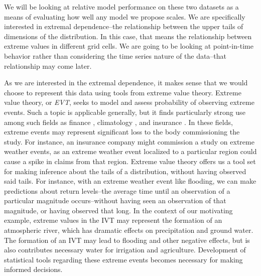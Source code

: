 We will be looking at relative model performance on these two datasets as a means of evaluating
  how well any model we propose scales.  We are specifically interested in extremal dependence--the
  relationship between the upper tails of dimensions of the distribution.  In this case, that means
  the relationship between extreme values in different grid cells.  We are going to be looking at
  point-in-time behavior rather than considering the time series nature of the data--that
  relationship may come later.

As we are interested in the extremal dependence, it makes sense that we would choose to represent
  this data using tools from extreme value theory.  Extreme value theory, or \emph{EVT}, seeks to
  model and assess probability of observing extreme events.  Such a topic is applicable generally,
  but it finds particularly strong use among such fields as finance \citep{allen2013},
  climatology \citep{trepanier2018}, and insurance \citep{beirlant1994}.  In these fields, extreme
  events may represent significant loss to the body commissioning the study.  For instance, an
  insurance company might commission a study on extreme weather events, as an extreme weather event
  localized to a particular region could cause a spike in claims from that region.  Extreme value
  theory offers us a tool set for making inference about the tails of a distribution, without having
  observed said tails.  For
  instance, with an extreme weather event like flooding, we can make predictions about return
  levels--the average time until an observation of a particular magnitude occurs--without having seen
  an observation of that magnitude, or having observed that long.  In the context of our motivating
  example, extreme values in the IVT may represent the formation of an atmospheric river, which has
  dramatic effects on precipitation and ground water.  The formation of an IVT may lead to flooding
  and other negative effects, but is also contributes necessary water for irrigation and agriculture.
  Development of statistical tools regarding these extreme events becomes necessary for making informed
  decisions.

